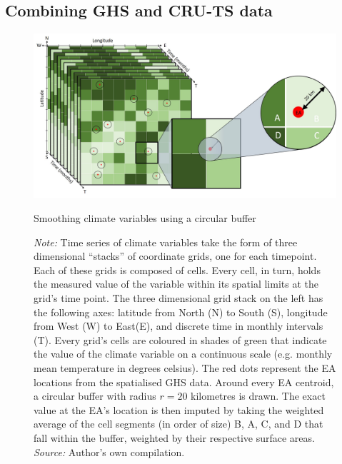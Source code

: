 \documentclass[a4paper,12pt]{article}
\theoremstyle{plain}
\theoremstyle{definition}
\theoremstyle{definition}
\theoremstyle{definition}
\theoremstyle{definition}
\begin{document}
\subsection{Combining GHS and CRU-TS data}
\label{sub:combining}
\begin{figure}[t!]
    \centering
    \includegraphics[scale=0.33]{../outputs/buffer.JPG}
    \caption{Smoothing climate variables using a circular buffer}
    \caption*{\footnotesize{\textit{Note:} Time series of climate variables take the form of three dimensional ``stacks'' of coordinate grids, one for each timepoint. Each of these grids is composed of cells. Every cell, in turn, holds the measured value of the variable within its spatial limits at the grid's time point. The three dimensional grid stack on the left has the following axes: latitude from North (N) to South (S), longitude from West (W) to East(E), and discrete time in monthly intervals (T). Every grid's cells are coloured in shades of green that indicate the value of the climate variable on a continuous scale (e.g. monthly mean temperature in degrees celsius). The red dots represent the EA locations from the spatialised GHS data. Around every EA centroid, a circular buffer with radius $r=20$ kilometres is drawn. The exact value at the EA's location is then imputed by taking the weighted average of the cell segments (in order of size) B, A, C, and D that fall within the buffer, weighted by their respective surface areas. \textit{Source:} Author's own compilation.}}
    \label{fig:buffer}
\end{figure}
\end{document}
